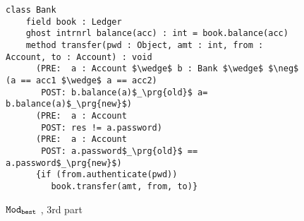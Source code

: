 
\begin{figure}[ht]
\begin{lstlisting}[mathescape=true, frame=lines]
  class Bank
    field book : Ledger
    ghost intrnrl balance(acc) : int = book.balance(acc)
    method transfer(pwd : Object, amt : int, from : Account, to : Account) : void
      (PRE:  a : Account $\wedge$ b : Bank $\wedge$ $\neg$ (a == acc1 $\wedge$ a == acc2)
       POST: b.balance(a)$_\prg{old}$ a= b.balance(a)$_\prg{new}$)
      (PRE:  a : Account
       POST: res != a.password)
      (PRE:  a : Account
       POST: a.password$_\prg{old}$ == a.password$_\prg{new}$)
      {if (from.authenticate(pwd))
         book.transfer(amt, from, to)}
\end{lstlisting}
\caption{${\texttt{Mod}}_{{\texttt{best}}}$ \funcSpecs,  3rd part}
\label{f:ex-bankThree}
\end{figure}


